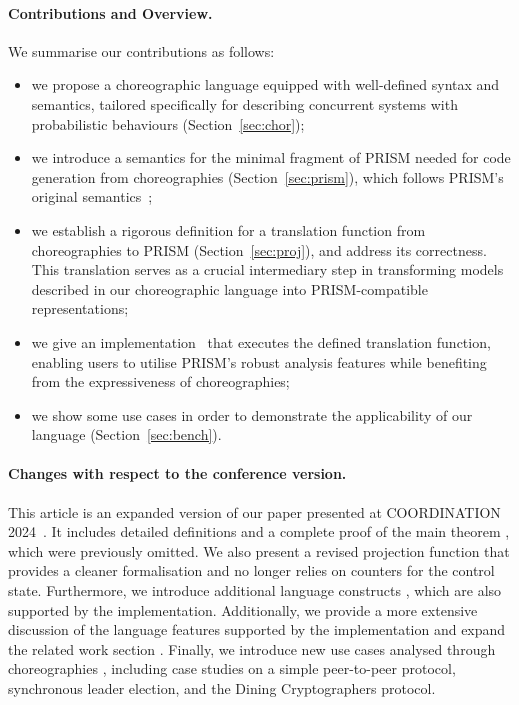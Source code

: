 \paragraph{Contributions and Overview.} We summarise our contributions as
follows:
\begin{itemize} 
\item we propose a choreographic language equipped with well-defined
  syntax and semantics, tailored specifically for describing
  concurrent systems with probabilistic behaviours
  (Section~\ref{sec:chor}); %

\item we introduce a semantics for the minimal fragment of PRISM
  needed for code generation from choreographies (Section~\ref{sec:prism}),
  which follows PRISM's original semantics~\cite{PRISMdoc};

\item we establish a rigorous definition for a translation function
  from choreographies to PRISM (Section~\ref{sec:proj}), and address its
  correctness. This translation serves as a crucial intermediary step
  in transforming models described in our choreographic language into
  PRISM-compatible representations;

\item we give an implementation~\cite{repository} that executes the
  defined translation function, enabling users to utilise PRISM's
  robust analysis features while benefiting from the expressiveness of
  choreographies;

\item we show some use cases in order to demonstrate the applicability
  of our language (Section~\ref{sec:bench}).
\end{itemize}


\paragraph{Changes with respect to the conference version.}
%
This article is an expanded version of our paper presented at
COORDINATION 2024~\cite{CV24}. It includes detailed definitions and a
complete proof of the main theorem ,
which were previously omitted. We also present a revised projection
function  that provides a cleaner
formalisation and no longer relies on counters for the control state.
Furthermore, we introduce additional language constructs
, which are also supported by
the implementation. Additionally, we provide a more extensive discussion
of the language features supported by the implementation and expand
the related work section . Finally,
we introduce new use cases analysed through choreographies
, including case studies on a simple
peer-to-peer protocol, synchronous leader election, and the Dining
Cryptographers protocol.

